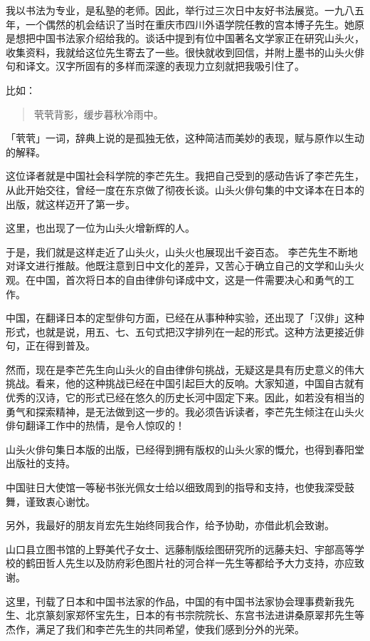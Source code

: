 {  我以书法为专业，是私塾的老师。因此，举行过三次日中友好书法展览。一九八五年，一个偶然的机会结识了当时在重庆市四川外语学院任教的宫本博子先生。她原是想把中国书法家介绍给我的。谈话中提到有位中国著名文学家正在研究山头火，收集资料，我就给这位先生寄去了一些。很快就收到回信，并附上墨书的山头火俳句和译文。汉字所固有的多样而深邃的表现力立刻就把我吸引住了。

  比如：
  \begin{quote}
      茕茕背影，缓步暮秋冷雨中。
  \end{quote}

  「茕茕」一词，辞典上说的是孤独无依，这种简洁而美妙的表现，赋与原作以生动的解释。

  这位译者就是中国社会科学院的李芒先生。我把自己受到的感动告诉了李芒先生，从此开始交往，曾经一度在东京做了彻夜长谈。山头火俳句集的中文译本在日本的出版，就这样迈开了第一步。

  这里，也出现了一位为山头火增新辉的人。

  于是，我们就是这样走近了山头火，山头火也展现出千姿百态。
  李芒先生不断地对译文进行推敲。他既注意到日中文化的差异，又苦心于确立自己的文学和山头火观。在中国，首次将日本的自由律俳句译成中文，这是一件需要决心和勇气的工作。

  中国，在翻译日本的定型俳句方面，已经在从事种种实验，还出现了「汉俳」这种形式，也就是说，用五、七、五句式把汉字排列在一起的形式。这种方法更接近俳句，正在得到普及。

  然而，现在是李芒先生向山头火的自由律俳句挑战，无疑这是具有历史意义的伟大挑战。看来，他的这种挑战已经在中国引起巨大的反响。大家知道，中国自古就有优秀的汉诗，它的形式已经在悠久的历史长河中固定下来。因此，如若没有相当的勇气和探索精神，是无法做到这一步的。我必须告诉读者，李芒先生倾注在山头火俳句翻译工作中的热情，是令人惊叹的！

  山头火俳句集日本版的出版，已经得到拥有版权的山头火家的慨允，也得到春阳堂出版社的支持。

  中国驻日大使馆一等秘书张光佩女士给以细致周到的指导和支持，也使我深受鼓舞，谨致衷心谢忱。

  另外，我最好的朋友肖宏先生始终同我合作，给予协助，亦借此机会致谢。

  山口县立图书馆的上野美代子女士、远藤制版绘图研究所的远藤夫妇、宇部高等学校的鹤田哲人先生以及防府彩色图片社的河合祥一先生等都给予大力支持，亦应致谢。

  这里，刊载了日本和中国书法家的作品，中国的有中国书法家协会理事费新我先生、北京篆刻家郑怀宝先生，日本的有书宗院院长、东宫书法进讲桑原翠邦先生等杰作，满足了我们和李芒先生的共同希望，使我们感到分外的光荣。

}
